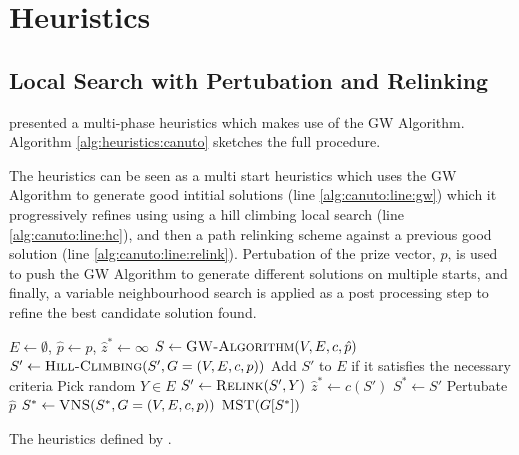 \section{Heuristics}\label{sec:solving:heuristics}

\subsection{Local Search with Pertubation and Relinking}\label{sec:canuto-search}

\citet{canuto2001local} presented a multi-phase heuristics which makes use of the GW Algorithm.
 Algorithm \ref{alg:heuristics:canuto} sketches the full procedure. 

 The heuristics can be seen as a multi start heuristics which uses the GW Algorithm
 to generate good intitial
 solutions (line \ref{alg:canuto:line:gw})
 which it progressively refines using using a hill climbing local search
 (line \ref{alg:canuto:line:hc}),
 and then a path relinking scheme against a previous good solution
 (line \ref{alg:canuto:line:relink}).
 Pertubation of the prize vector, $p$, is used to push the GW Algorithm to generate
 different solutions on multiple starts, and finally, a
 variable neighbourhood search is applied as a
 post processing step to refine the best candidate solution found.

 \begin{algorithm}[h!]
   \begin{algorithmic}[1]
     \State $E \gets \emptyset$, $\hat{p} \gets p$, $\hat{z}^* \gets \infty$
     \State $S \gets \Call{GW-Algorithm}{V,E, c, \hat{p}}$ \label{alg:canuto:line:gw}
     \State $S' \gets \Call{Hill-Climbing}{S', G = (V, E, c, p)}$ \label{alg:canuto:line:hc}
     \State Add $S'$ to $E$ if it satisfies the necessary criteria \label{alg:canuto:line:elite}
     \State Pick random $Y \in E$
     \State $S' \gets \Call{Relink}{S', Y}$ \label{alg:canuto:line:relink}
     \State $\hat{z}^* \gets c(S')$
     \State $S^* \gets S'$
     \EndIf
     \EndIf
     \State Pertubate $\hat{p}$
     \EndFor
     \State $S^* \gets \Call{VNS}{S^*, G = (V, E, c, p)}$\label{alg:canuto:line:vns}
     \State \Return $\Call{MST}{G[S^*]}$
     \EndProcedure
 \end{algorithmic}
 \caption{The heuristics defined by \citet{canuto2001local}.}\label{alg:heuristics:canuto}
 \end{algorithm}

